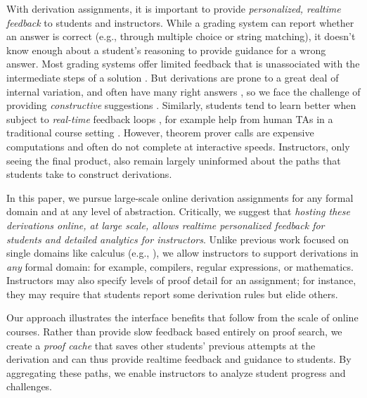 \documentclass{sigchi}
\begin{document}
With derivation assignments, it is important to provide \textit{personalized, realtime feedback} to students and instructors. While a grading system can report whether an answer is correct (e.g., through multiple choice or string matching), it doesn't know enough about a student's reasoning to provide guidance for a wrong answer. Most grading systems offer limited feedback that is unassociated with the intermediate steps of a solution \cite{coursera-doc}. But derivations are prone to a great deal of internal variation, and often have many right answers \cite{derivation-scoring}, so we face the challenge of providing \textit{constructive} suggestions \cite{personalized-feedback}. Similarly, students tend to learn better when subject to \textit{real-time} feedback loops \cite{locusoffeedback}, for example help from human TAs in a traditional course setting \cite{personalized-feedback, derivation-scoring, human-tutoring}. However, theorem prover calls are expensive computations \cite{bisearch} and often do not complete at interactive speeds. Instructors, only seeing the final product, also remain largely uninformed about the paths that students take to construct derivations.

In this paper, we pursue large-scale online derivation assignments for any formal domain and at any level of abstraction. Critically, we suggest that \textit{hosting these derivations online, at large scale, allows realtime personalized feedback for students and detailed analytics for instructors}. Unlike previous work focused on single domains like calculus (e.g., \cite{theorema,coq}), we allow instructors to support derivations in \textit{any} formal domain: for example, compilers, regular expressions, or mathematics. Instructors may also specify levels of proof detail for an assignment; for instance, they may require that students report some derivation rules but elide others. 

Our approach illustrates the interface benefits that follow from the scale of online courses. Rather than provide slow feedback based entirely on proof search, we create a \textit{proof cache} that saves other students' previous attempts at the derivation and can thus provide realtime feedback and guidance to students. By aggregating these paths, we enable instructors to analyze student progress and challenges. 

\end{document}
